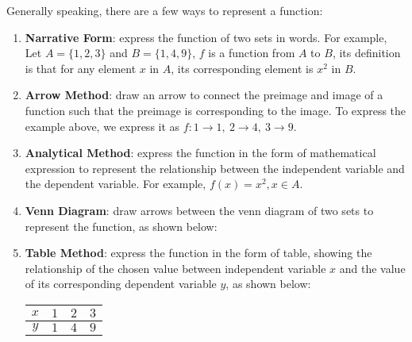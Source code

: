 \documentclass[12pt]{report}
\begin{document}
Generally speaking, there are a few ways to represent a function:
\begin{enumerate}
  \item \textbf{Narrative Form}: express the function of two sets in words. For example, Let $A = \big\{1, 2, 3\big\}$ and $B = \big\{1, 4, 9\big\}$, $f$ is a function from $A$ to $B$, its definition is that for any element $x$ in $A$, its corresponding element is $x^2$ in $B$.
  \item \textbf{Arrow Method}: draw an arrow to connect the preimage and image of a function such that the preimage is corresponding to the image. To express the example above, we express it as $f: 1 \to 1,\ 2 \to 4,\ 3 \to 9$.
  \item \textbf{Analytical Method}: express the function in the form of mathematical expression to represent the relationship between the independent variable and the dependent variable. For example, $f(x) = x^2, x \in A$.
  \item \textbf{Venn Diagram}: draw arrows between the venn diagram of two sets to represent the function, as shown below:
        \begin{center}
        \end{center}
  \item \textbf{Table Method}: express the function in the form of table, showing the relationship of the chosen value between independent variable $x$ and the value of its corresponding dependent variable $y$, as shown below:
        \begin{center}
          \begin{tabular}{|c|c|c|c|}
            \hline
            $x$ & $1$ & $2$ & $3$ \\
            \hline
            $y$ & $1$ & $4$ & $9$ \\
            \hline
          \end{tabular}
        \end{center}


\end{enumerate}
\end{document}
